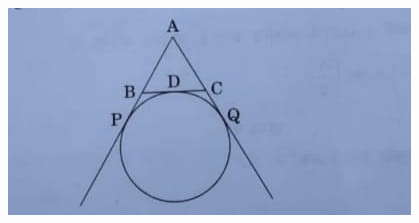\begin{enumerate}
\begin{figure}[H]
\centering
\includegraphics[width=\columnwidth]{figs/circ4.jpg}
\caption{} 
\label{fig:circ4}
\end{figure}
\end{enumerate}
